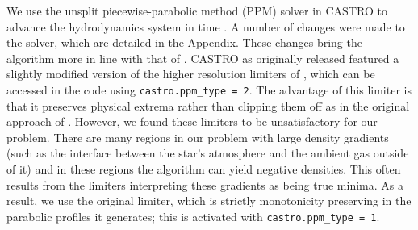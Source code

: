 \documentclass[12pt,preprint]{aastex}
\begin{document}
We use the unsplit piecewise-parabolic method (PPM) solver in CASTRO to advance the hydrodynamics system in time \citep{ppmunsplit}.  A number of changes were made to the solver, which are detailed in the Appendix.  These changes bring the algorithm more in line with that of \cite{ppm}. CASTRO as originally released featured a slightly modified version of the higher resolution limiters of \cite{colella_sekora:2008}, which can be accessed in the code using \texttt{castro.ppm\_type = 2}. The advantage of this limiter is that it preserves physical extrema rather than clipping them off as in the original approach of \cite{ppm}. However, we found these limiters to be unsatisfactory for our problem. There are many regions in our problem with large density gradients (such as the interface between the star's atmosphere and the ambient gas outside of it) and in these regions the algorithm can yield negative densities. This often results from the limiters interpreting these gradients as being true minima. As a result, we use the original limiter, which is strictly monotonicity preserving in the parabolic profiles it generates; this is activated with \texttt{castro.ppm\_type = 1}.
\end{document}
